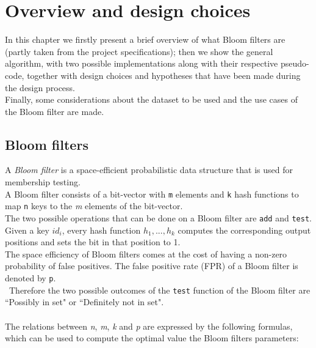 %       
%
\chapter{Overview and design choices}\label{ch:design}
In this chapter we firstly present a brief overview of what Bloom filters are (partly taken from the project specifications); then we show the general algorithm, with two possible implementations along with their respective pseudo-code, together with design choices and hypotheses that have been made during the design process.\\
Finally, some considerations about the dataset to be used and the use cases of the Bloom filter are made.\\

\section{Bloom filters}\label{sec:bloom_filters}
A \textit{Bloom filter} is a space-efficient probabilistic data structure that is used for membership testing.\\
A Bloom filter consists of a bit-vector with \colorbox{gray!30}{\large \texttt{m}} elements and \colorbox{gray!30}{\large \texttt{k}} hash functions to map \colorbox{gray!30}{\large \texttt{n}} keys to the \textit{m} elements of the bit-vector.\\
The two possible operations that can be done on a Bloom filter are \texttt{add} and \texttt{test}.\\
Given a key \textit{$id_{i}$}, every hash function \textit{$h_{1}, ..., h_{k}$} computes the corresponding output positions and sets the bit in that position to 1.\\
The space efficiency of Bloom filters comes at the cost of having a non-zero probability of false positives. The false positive rate (FPR) of a Bloom filter is denoted by \colorbox{gray!30}{\large \texttt{p}}.\\\
Therefore the two possible outcomes of the \texttt{test} function of the Bloom filter are ``Possibly in set" or ``Definitely not in set".\\
\\
\noindent The relations between \textit{n}, \textit{m}, \textit{k} and \textit{p} are expressed by the following formulas, which can be used to compute the optimal value the Bloom filters parameters:

